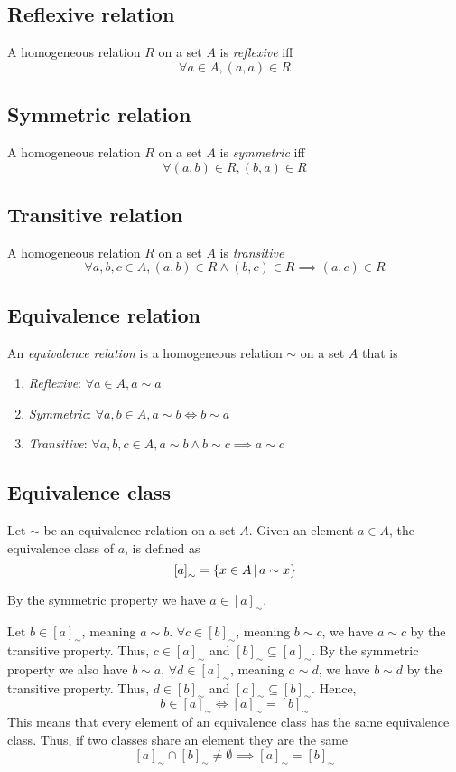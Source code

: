 \documentclass[a4paper]{article}
\begin{document}
\subsection{Reflexive relation}

A homogeneous relation \(R\) on a set \(A\) is \textit{reflexive}
iff
\[
    \forall a\in A, (a,a) \in R
\]

\subsection{Symmetric relation}

A homogeneous relation \(R\) on a set \(A\) is \textit{symmetric}
iff
\[
    \forall (a,b) \in R, (b,a) \in R
\]

\subsection{Transitive relation}

A homogeneous relation \(R\) on a set \(A\) is \textit{transitive}
\[
    \forall a,b,c \in A, (a,b) \in R \land (b,c) \in R \implies (a,c) \in R 
\]

\subsection{Equivalence relation}

An \textit{equivalence relation} is a homogeneous relation \(\sim\) on a set \(A\)
that is
\begin{enumerate}
    \item \textit{Reflexive}: \(\forall a \in A, a \sim a\)
    \item \textit{Symmetric}: \(\forall a,b \in A, a \sim b \iff b \sim a\)
    \item \textit{Transitive}: \(\forall a,b,c \in A, a \sim b \land b \sim c \implies a \sim c\)
\end{enumerate}

\subsection{Equivalence class}

Let \(\sim\) be an equivalence relation on a set \(A\).
Given an element \(a\in A\), the equivalence class of \(a\), is defined as
\[
    {[a]}_{\sim} = \{x \in A \,|\, a \sim x\}
\]

By the symmetric property we have \(a \in {[a]}_{\sim}\).

Let \(b \in {[a]}_{\sim}\), meaning \(a \sim b\). \(\forall c \in {[b]}_{\sim}\),
meaning \(b \sim c\), we have \(a \sim c\) by the transitive property.
Thus, \(c \in {[a]}_{\sim}\) and \({[b]}_{\sim} \subseteq {[a]}_{\sim}\).
By the symmetric property we also have \(b \sim a\),
\(\forall d \in {[a]}_{\sim}\), meaning \(a \sim d\), we have
\(b \sim d\) by the transitive property. Thus, \(d \in {[b]}_{\sim}\)
and \({[a]}_{\sim} \subseteq {[b]}_{\sim}\). Hence,
\[
    b \in {[a]}_{\sim} \iff {[a]}_{\sim} = {[b]}_{\sim}
\]
This means that every element of an equivalence class has the same equivalence class.
Thus, if two classes share an element they are the same
\[
    {[a]}_{\sim} \cap {[b]}_{\sim} \neq \emptyset
    \implies {[a]}_{\sim} = {[b]}_{\sim}
\]
\end{document}
